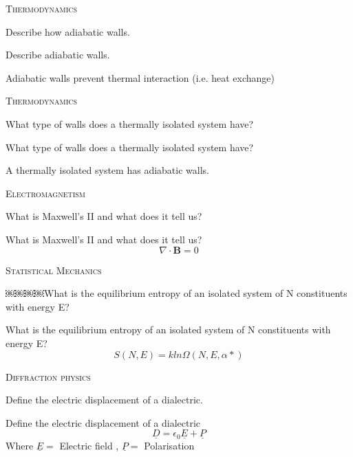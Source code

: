 \documentclass{article}
\newenvironment{flashcard}[2][\parskipfill]{%
\noindent   \textsc{#1}

\vfill
\centerline{{\Large{#2}}}
\vfill
\newpage
}
{\newpage}
\begin{document}

\begin{flashcard}[Thermodynamics]{Describe how adiabatic walls.}

Describe adiabatic walls.

Adiabatic walls prevent thermal interaction (i.e. heat exchange) 
\end{flashcard}


\begin{flashcard}[Thermodynamics]{What type of walls does a thermally isolated system have?}

What type of walls does a thermally
 isolated system have?

A thermally isolated system has adiabatic walls.
\end{flashcard}


\begin{flashcard}[Electromagnetism]{What is Maxwell's II  and what does it tell us?}
What is Maxwell's II and what does it tell us?
$$\nabla \cdot \mathbf{B} = 0$$
\end{flashcard}


\begin{flashcard}[Statistical Mechanics]{￼￼￼￼What is the equilibrium entropy of an isolated system of N constituents with energy E? }
What is the equilibrium entropy of an isolated system of N constituents with energy E?
$$S(N, E) = k ln \Omega(N, E, {\alpha*})$$

\end{flashcard}


\begin{flashcard}[Diffraction physics]{Define the electric displacement of a dialectric.}
Define the electric displacement of a dialectric
$$\underline{D}=\epsilon_0 \underline{E}+\underline{P}$$
Where $ \underline{E}=$ Electric field , $\underline{P}=$ Polarisation

\end{flashcard}
\end{document}
